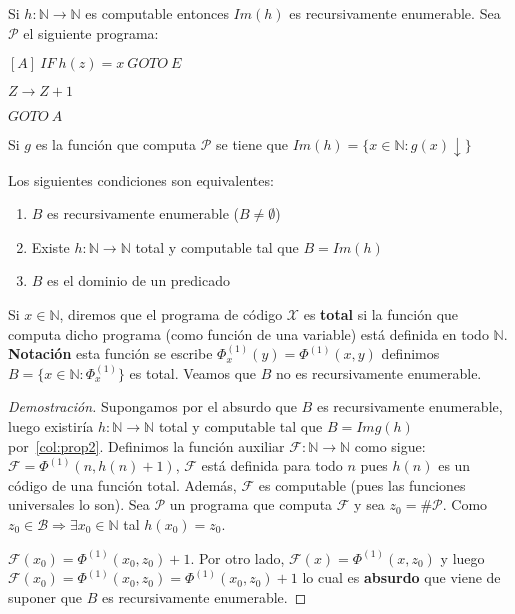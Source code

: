 \begin{proposition}
Si $h \colon \mathbb{N} \to \mathbb{N}$ es computable entonces $Im(h)$ es recursivamente enumerable. Sea $\mathcal{P}$ el siguiente programa:

$[A] \ IF \ h(z) = x \ GOTO \ E$

$Z \rightarrow Z + 1$

$GOTO \ A$

Si $g$ es la funci\'on que computa $\mathcal{P}$ se tiene que $Im(h) = \{ x \in \mathbb{N} \colon g(x) \downarrow \}$

\end{proposition}

\begin{colorario}
Los siguientes condiciones son equivalentes:

\begin{enumerate}
	\item $B$ es recursivamente enumerable ($B \neq \emptyset$)
	\item\label{col:prop2} Existe $h \colon \mathbb{N} \to \mathbb{N}$ total y computable tal que $B = Im(h)$
	\item $B$ es el dominio de un predicado
\end{enumerate}

\end{colorario}

Si $x \in \mathbb{N}$, diremos que el programa de c\'odigo $\mathcal{X}$ es \textbf{total} si la funci\'on que computa dicho programa (como funci\'on de una variable) est\'a definida en todo $\mathbb{N}$. \textbf{Notaci\'on} esta funci\'on se escribe $\Phi^{(1)}_{x}(y) = \Phi^{(1)}(x, y)$ definimos $B = \{ x \in \mathbb{N} \colon \Phi^{(1)}_{x}\}$  es total. Veamos que $B$ no es recursivamente enumerable.

\begin{proof}[Demostraci\'on]
Supongamos por el absurdo que $B$ es recursivamente enumerable, luego existir\'ia $h \colon \mathbb{N} \to \mathbb{N}$ total y computable tal que $B = Img(h)$ por~\ref{col:prop2}. Definimos la funci\'on auxiliar $\mathcal{F} \colon \mathbb{N} \to \mathbb{N}$ como sigue: $\mathcal{F} = \Phi^{(1)}(n, h(n) + 1)$, $\mathcal{F}$ est\'a definida para todo $n$ pues $h(n)$ es un c\'odigo de una funci\'on total. Adem\'as, $\mathcal{F}$ es computable (pues las funciones universales lo son). Sea $\mathcal{P}$ un programa que computa $\mathcal{F}$ y sea $z_0 = \# \mathcal{P}$. Como $z_0 \in \mathcal{B} \Rightarrow \exists x_0 \in \mathbb{N}$ tal $h(x_0) = z_0$.

$\mathcal{F}(x_0) = \Phi^{(1)}(x_0, z_0) + 1$. Por otro lado, $\mathcal{F}(x) = \Phi^{(1)}(x, z_0)$ y luego $\mathcal{F}(x_0) = \Phi^{(1)}(x_0, z_0) = \Phi^{(1)}(x_0, z_0) + 1$ lo cual es \textbf{absurdo} que viene de suponer que $B$ es recursivamente enumerable.

\end{proof}

